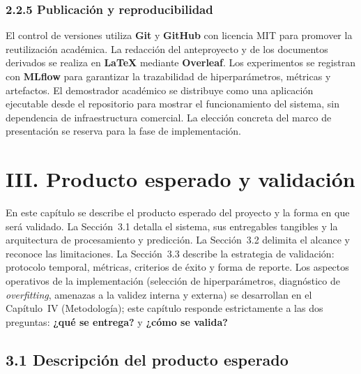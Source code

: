 \documentclass[12pt,letterpaper]{report}
\begin{document}
\subsection{2.2.5 Publicación y reproducibilidad}

El control de versiones utiliza \textbf{Git} y \textbf{GitHub} con licencia MIT para promover la reutilización académica. La redacción del anteproyecto y de los documentos derivados se realiza en \textbf{\LaTeX} mediante \textbf{Overleaf}. Los experimentos se registran con \textbf{MLflow} para garantizar la trazabilidad de hiperparámetros, métricas y artefactos. El demostrador académico se distribuye como una aplicación ejecutable desde el repositorio para mostrar el funcionamiento del sistema, sin dependencia de infraestructura comercial. La elección concreta del marco de presentación se reserva para la fase de implementación.

\clearpage

\chapter{III. Producto esperado y validación}

En este capítulo se describe el producto esperado del proyecto y la forma en que será validado. La Sección~3.1 detalla el sistema, sus entregables tangibles y la arquitectura de procesamiento y predicción. La Sección~3.2 delimita el alcance y reconoce las limitaciones. La Sección~3.3 describe la estrategia de validación: protocolo temporal, métricas, criterios de éxito y forma de reporte. Los aspectos operativos de la implementación (selección de hiperparámetros, diagnóstico de \textit{overfitting}, amenazas a la validez interna y externa) se desarrollan en el Capítulo~IV (Metodología); este capítulo responde estrictamente a las dos preguntas: \textbf{¿qué se entrega?} y \textbf{¿cómo se valida?}

\section{3.1 Descripción del producto esperado}
\end{document}
